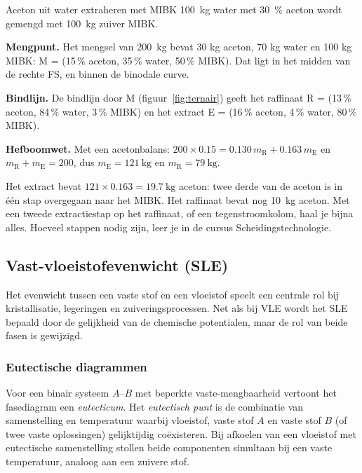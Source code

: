 \begin{voorbeeld}{Aceton uit water extraheren met MIBK}
\SI{100}{\kilo\gram} water met \SI{30}{\percent} aceton wordt gemengd met \SI{100}{\kilo\gram} zuiver MIBK.

\textbf{Mengpunt.} Het mengsel van \SI{200}{\kilo\gram} bevat 30 kg aceton, 70 kg water en 100 kg MIBK: M = (15\,\% aceton, 35\,\% water, 50\,\% MIBK). Dat ligt in het midden van de rechte FS, en binnen de binodale curve.

\textbf{Bindlijn.} De bindlijn door M (figuur~\ref{fig:ternair}) geeft het raffinaat R = (13\,\% aceton, 84\,\% water, 3\,\% MIBK) en het extract E = (16\,\% aceton, 4\,\% water, 80\,\% MIBK).

\textbf{Hefboomwet.} Met een acetonbalans: $200 \times 0.15 = 0.130\,m_\mathrm{R} + 0.163\,m_\mathrm{E}$ en $m_\mathrm{R} + m_\mathrm{E} = 200$, dus $m_\mathrm{E} = \SI{121}{\kilo\gram}$ en $m_\mathrm{R} = \SI{79}{\kilo\gram}$.

Het extract bevat $121 \times 0.163 = \SI{19.7}{\kilo\gram}$ aceton: twee derde van de aceton is in \'e\'en stap overgegaan naar het MIBK. Het raffinaat bevat nog \SI{10}{\kilo\gram} aceton. Met een tweede extractiestap op het raffinaat, of een tegenstroomkolom, haal je bijna alles. Hoeveel stappen nodig zijn, leer je in de cursus Scheidingstechnologie.
\end{voorbeeld}

\subsection{Vast-vloeistofevenwicht (SLE)}
\label{sec:sle}

Het evenwicht tussen een vaste stof en een vloeistof speelt een centrale rol bij kristallisatie, legeringen en zuiveringsprocessen. Net als bij VLE wordt het SLE bepaald door de gelijkheid van de chemische potentialen, maar de rol van beide fasen is gewijzigd.

\subsubsection{Eutectische diagrammen}
\label{sec:eutecticum}

Voor een binair systeem $A$--$B$ met beperkte vaste-mengbaarheid vertoont het fasediagram een \emph{eutecticum}. Het \emph{eutectisch punt} is de combinatie van samenstelling en temperatuur waarbij vloeistof, vaste stof $A$ en vaste stof $B$ (of twee vaste oplossingen) gelijktijdig co\"existeren. Bij afkoelen van een vloeistof met eutectische samenstelling stollen beide componenten simultaan bij een vaste temperatuur, analoog aan een zuivere stof.

